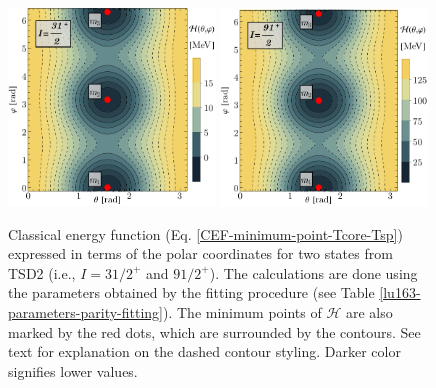 \begin{figure}
    \centering
    \includegraphics[width=0.49\textwidth]{Chapters/Figures/parity-partners-plots/contour-tsd2-1.pdf}
    \includegraphics[width=0.49\textwidth]{Chapters/Figures/parity-partners-plots/contour-tsd2-2.pdf}
    \caption{Classical energy function (Eq. \ref{CEF-minimum-point-Tcore-Tsp}) expressed in terms of the polar coordinates for two states from TSD2 (i.e., $I=31/2^+$ and $91/2^+$). The calculations are done using the parameters obtained by the fitting procedure (see Table \ref{lu163-parameters-parity-fitting}). The minimum points of $\mathcal{H}$ are also marked by the red dots, which are surrounded by the contours. See text for explanation on the dashed contour styling. Darker color signifies lower values.}
    \label{contour-cef-polar-tsd2}
\end{figure}
